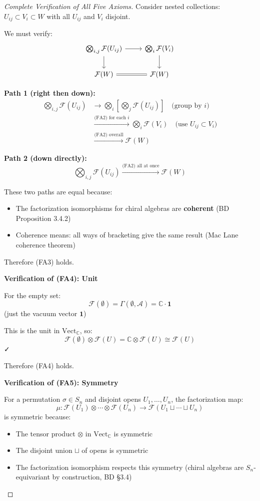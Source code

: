 \begin{proof}[Complete Verification of All Five Axioms]
Consider nested collections: $U_{ij} \subset V_i \subset W$ with all $U_{ij}$ and 
$V_i$ disjoint.

We must verify:
$$\begin{tikzcd}
\bigotimes_{i,j} \mathcal{F}(U_{ij}) 
   \arrow[r] \arrow[d] &
\bigotimes_i \mathcal{F}(V_i) \arrow[d] \\
\mathcal{F}(W) \arrow[r, equal] & \mathcal{F}(W)
\end{tikzcd}$$

\textbf{Path 1 (right then down):}
\begin{align*}
\bigotimes_{i,j} \mathcal{F}(U_{ij}) 
&\to \bigotimes_i \left[\bigotimes_j \mathcal{F}(U_{ij})\right] 
   \quad \text{(group by } i\text{)} \\
&\xrightarrow{\text{(FA2) for each } i} \bigotimes_i \mathcal{F}(V_i) 
   \quad \text{(use } U_{ij} \subset V_i\text{)} \\
&\xrightarrow{\text{(FA2) overall}} \mathcal{F}(W)
\end{align*}

\textbf{Path 2 (down directly):}
$$\bigotimes_{i,j} \mathcal{F}(U_{ij}) \xrightarrow{\text{(FA2) all at once}} 
   \mathcal{F}(W)$$

These two paths are equal because:
\begin{itemize}
\item The factorization isomorphisms for chiral algebras are \textbf{coherent} 
   (BD Proposition 3.4.2)
\item Coherence means: all ways of bracketing give the same result (Mac Lane coherence 
   theorem)
\end{itemize}

Therefore (FA3) holds.

\textbf{Verification of (FA4): Unit}

For the empty set:
$$\mathcal{F}(\emptyset) = \Gamma(\emptyset, \mathcal{A}) = \mathbb{C} \cdot \mathbf{1}$$
(just the vacuum vector $\mathbf{1}$)

This is the unit in $\text{Vect}_{\mathbb{C}}$, so:
$$\mathcal{F}(\emptyset) \otimes \mathcal{F}(U) = \mathbb{C} \otimes \mathcal{F}(U) 
   \cong \mathcal{F}(U)$$ ✓

Therefore (FA4) holds.

\textbf{Verification of (FA5): Symmetry}

For a permutation $\sigma \in S_n$ and disjoint opens $U_1, \ldots, U_n$, the 
factorization map:
$$\mu: \mathcal{F}(U_1) \otimes \cdots \otimes \mathcal{F}(U_n) \to 
   \mathcal{F}(U_1 \sqcup \cdots \sqcup U_n)$$
is symmetric because:
\begin{itemize}
\item The tensor product $\otimes$ in $\text{Vect}_{\mathbb{C}}$ is symmetric
\item The disjoint union $\sqcup$ of opens is symmetric
\item The factorization isomorphism respects this symmetry (chiral algebras are 
   $S_n$-equivariant by construction, BD §3.4)
\end{itemize}


\end{proof}
